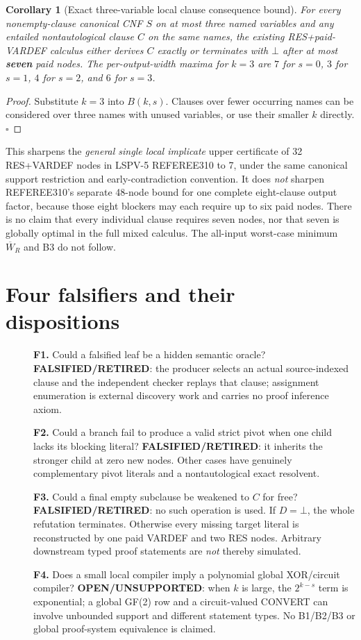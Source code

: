 \documentclass[11pt]{article}
\newtheorem{corollary}[theorem]{Corollary}
\begin{document}
\begin{corollary}[Exact three-variable local clause consequence bound]
For every nonempty-clause canonical CNF $S$ on at most three named variables and any entailed nontautological clause $C$ on the same names, the existing RES+paid-VARDEF calculus either derives $C$ exactly or terminates with $\bot$ after at most \textbf{seven} paid nodes. The per-output-width maxima for $k=3$ are $7$ for $s=0$, $3$ for $s=1$, $4$ for $s=2$, and $6$ for $s=3$.
\end{corollary}
\begin{proof}
Substitute $k=3$ into $B(k,s)$. Clauses over fewer occurring names can be considered over three names with unused variables, or use their smaller $k$ directly. \hfill$\square$
\end{proof}

\noindent This sharpens the \emph{general single local implicate} upper certificate of 32 RES+VARDEF nodes in LSPV-5 REFEREE310 to 7, under the same canonical support restriction and early-contradiction convention. It does \emph{not} sharpen REFEREE310's separate 48-node bound for one complete eight-clause output factor, because those eight blockers may each require up to six paid nodes. There is no claim that every individual clause requires seven nodes, nor that seven is globally optimal in the full mixed calculus. The all-input worst-case minimum $\overline W_R$ and B3 do not follow.

\section*{Four falsifiers and their dispositions}
\begin{description}
\item[] \textbf{F1.} Could a falsified leaf be a hidden semantic oracle? \textbf{FALSIFIED/RETIRED}: the producer selects an actual source-indexed clause and the independent checker replays that clause; assignment enumeration is external discovery work and carries no proof inference axiom.
\item[] \textbf{F2.} Could a branch fail to produce a valid strict pivot when one child lacks its blocking literal? \textbf{FALSIFIED/RETIRED}: it inherits the stronger child at zero new nodes. Other cases have genuinely complementary pivot literals and a nontautological exact resolvent.
\item[] \textbf{F3.} Could a final empty subclause be weakened to $C$ for free? \textbf{FALSIFIED/RETIRED}: no such operation is used. If $D=\bot$, the whole refutation terminates. Otherwise every missing target literal is reconstructed by one paid VARDEF and two RES nodes. Arbitrary downstream typed proof statements are \emph{not} thereby simulated.
\item[] \textbf{F4.} Does a small local compiler imply a polynomial global XOR/circuit compiler? \textbf{OPEN/UNSUPPORTED}: when $k$ is large, the $2^{k-s}$ term is exponential; a global GF(2) row and a circuit-valued CONVERT can involve unbounded support and different statement types. No B1/B2/B3 or global proof-system equivalence is claimed.
\end{description}
\end{document}

